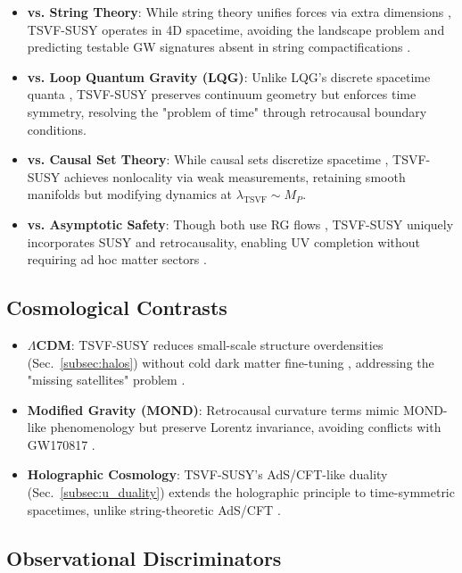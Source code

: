 \documentclass[twocolumn,superscriptaddress,floatfix]{revtex4-2}
\begin{document}
\begin{itemize}
\item \textbf{vs. String Theory}: While string theory unifies forces via extra dimensions \cite{Polchinski1998}, TSVF-SUSY operates in 4D spacetime, avoiding the landscape problem \cite{Susskind2003} and predicting testable GW signatures absent in string compactifications \cite{Green2012}.  
\item \textbf{vs. Loop Quantum Gravity (LQG)}: Unlike LQG's discrete spacetime quanta \cite{Rovelli2004}, TSVF-SUSY preserves continuum geometry but enforces time symmetry, resolving the "problem of time" \cite{Kuchar2011} through retrocausal boundary conditions.  
\item \textbf{vs. Causal Set Theory}: While causal sets discretize spacetime \cite{Sorkin2003}, TSVF-SUSY achieves nonlocality via weak measurements, retaining smooth manifolds but modifying dynamics at \( \lambda_{\text{TSVF}} \sim M_P \).  
\item \textbf{vs. Asymptotic Safety}: Though both use RG flows \cite{Reuter1998}, TSVF-SUSY uniquely incorporates SUSY and retrocausality, enabling UV completion without requiring ad hoc matter sectors \cite{Niedermaier2006}.  
\end{itemize}

\subsection{Cosmological Contrasts}
\label{subsec:cosmo_comparison}

\begin{itemize}
\item \textbf{\(\Lambda\)CDM}: TSVF-SUSY reduces small-scale structure overdensities (Sec.~\ref{subsec:halos}) without cold dark matter fine-tuning \cite{Bullock2017}, addressing the "missing satellites" problem \cite{Klypin1999}.  
\item \textbf{Modified Gravity (MOND)}: Retrocausal curvature terms mimic MOND-like phenomenology \cite{McGaugh2016} but preserve Lorentz invariance, avoiding conflicts with GW170817 \cite{Ezquiaga2018}.  
\item \textbf{Holographic Cosmology}: TSVF-SUSY's AdS/CFT-like duality (Sec.~\ref{subsec:u_duality}) extends the holographic principle \cite{Bousso2002} to time-symmetric spacetimes, unlike string-theoretic AdS/CFT \cite{Maldacena1999}.  
\end{itemize}

\subsection{Observational Discriminators}
\label{subsec:discriminators}
\end{document}
